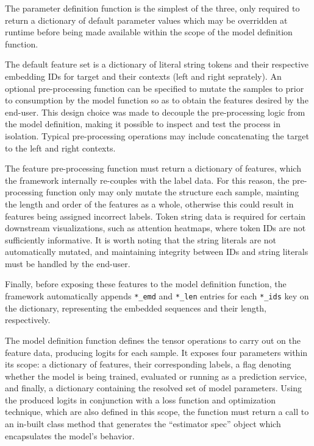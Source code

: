 \documentclass[../../fyp.tex]{subfiles}
\begin{document}
The parameter definition function is the simplest of the three, only required to return a dictionary of default parameter values which may be overridden at runtime before being made available within the scope of the model definition function.

The default feature set is a dictionary of literal string tokens and their respective embedding IDs for target and their contexts (left and right seprately). An optional pre-processing function can be specified to mutate the samples to prior to consumption by the model function so as to obtain the features desired by the end-user. This design choice was made to decouple the pre-processing logic from the model definition, making it possible to inspect and test the process in isolation. Typical pre-processing operations may include concatenating the target to the left and right contexts. 

The feature pre-processing function must return a dictionary of features, which the framework internally re-couples with the label data. For this reason, the pre-processing function only may only mutate the structure each sample, mainting the length and order of the features as a whole, otherwise this could result in features being assigned incorrect labels. Token string data is required for certain downstream visualizations, such as attention heatmaps, where token IDs are not sufficiently informative. It is worth noting that the string literals are not automatically mutated, and maintaining integrity between IDs and string literals must be handled by the end-user. 

Finally, before exposing these features to the model definition function, the framework automatically appends \texttt{*\_emd} and \texttt{*\_len} entries for each \texttt{*\_ids} key on the dictionary, representing the embedded sequences and their length, respectively.

The model definition function defines the tensor operations to carry out on the feature data, producing logits for each sample. It exposes four parameters within its scope: a dictionary of features, their corresponding labels, a flag denoting whether the model is being trained, evaluated or running as a prediction service, and finally, a dictionary containing the resolved set of model parameters. Using the produced logits in conjunction with a loss function and optimization technique, which are also defined in this scope, the function must return a call to an in-built class method that generates the \enquote{estimator spec} object which encapsulates the model's behavior. 
\end{document}
